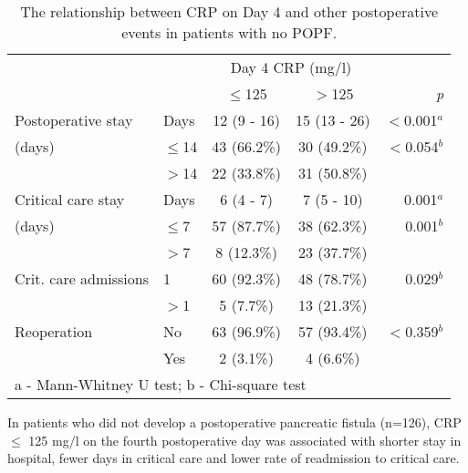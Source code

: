 \begin{table}[p]
	\centering
	\caption{The relationship between CRP on Day 4 and other postoperative events in patients with no POPF.}
	\label{table:crp_comp_CRP4_vs_LOS}
	\renewcommand{\arraystretch}{1.4} %
	\setlength{\tabcolsep}{9pt} %
	\begin{tabular}{|l l  c c r |}
		\hline
		                      &          & \multicolumn{2}{c}{Day 4 CRP (mg/l)} &  \\
		                      &          & $\leq$125   & $>$125                   & \textit{p}   \\ \hline
		Postoperative stay    & Days     & 12 (9 - 16) & 15 (13 - 26)             & $<$0.001$^a$ \\
		(days)                & $\leq$14 & 43 (66.2\%) & 30 (49.2\%)              & $<$0.054$^b$ \\
		                      & $>$14    & 22 (33.8\%) & 31 (50.8\%)              &  \\
		Critical care stay    & Days     & 6 (4 - 7)   & 7 (5 - 10)               & 0.001$^a$    \\
		(days)                & $\leq$7  & 57 (87.7\%) & 38 (62.3\%)              & 0.001$^b$    \\
		                      & $>$7     & 8 (12.3\%)  & 23 (37.7\%)              &  \\
		Crit. care admissions & 1        & 60 (92.3\%) & 48 (78.7\%)              & 0.029$^b$    \\
		                      & $>$1     & 5 (7.7\%)   & 13 (21.3\%)              &  \\
		Reoperation           & No       & 63 (96.9\%) & 57 (93.4\%)              & $<$0.359$^b$ \\
		                      & Yes      & 2 (3.1\%)   & 4 (6.6\%)                &  \\ \hline
		\multicolumn{5}{l}{a - Mann-Whitney U test; b - Chi-square test}
	\end{tabular}
	\medskip
	\begin{flushleft}
		In patients who did not develop a postoperative pancreatic fistula (n=126), CRP $\leq$ 125 mg/l on the fourth postoperative day was associated with shorter stay in hospital, fewer days in critical care and lower rate of readmission to critical care.
	\end{flushleft}
\end{table}



